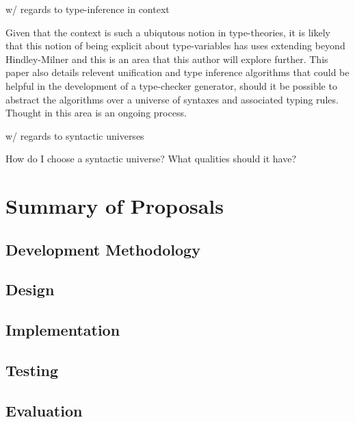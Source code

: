 \documentclass{ProgressReport}[2020/09/15]
\begin{document}
          w/ regards to type-inference in context
        
          Given that the context is such a ubiqutous notion in
          type-theories, it is likely that this notion of being
          explicit about type-variables has uses extending beyond
          Hindley-Milner and this is an area that this author will explore
          further. This paper also details relevent unification and type
          inference algorithms that could be helpful in the
          development of a type-checker generator, should it be
          possible to abstract the algorithms over a universe of
          syntaxes and associated typing rules. Thought in this area
          is an ongoing process.

          w/ regards to syntactic universes

          How do I choose a syntactic universe? What qualities should
          it have?

        \chapter{Summary of Proposals}
        \section{Development Methodology}
        \section{Design}
        \section{Implementation}
        \section{Testing}
        \section{Evaluation}
	
	
	
	\clearpage
	\printbibliography
	\nocite{*} %
\end{document}
